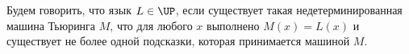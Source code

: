 





\setcounter{curtask}{63}


\begin{definition*}
    Будем говорить, что язык $L \in \UP$, если существует такая недетерминированная машина Тьюринга $M$,
    что для любого $x$ выполнено $M(x) = L(x)$ и существует не более одной подсказки, которая принимается
    машиной $M$.
\end{definition*}



\breakline







